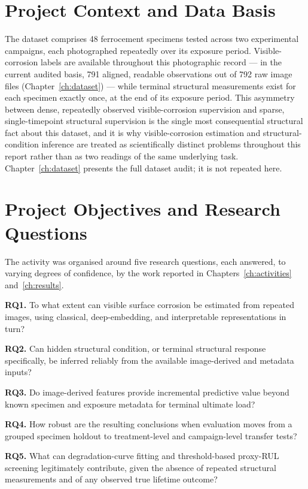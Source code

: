 \section{Project Context and Data Basis}
\label{sec:intro-context}

The dataset comprises 48 ferrocement specimens tested across two
experimental campaigns, each photographed repeatedly over its exposure
period. Visible-corrosion labels are available throughout this
photographic record — in the current audited basis, 791 aligned, readable
observations out of 792 raw image files (Chapter~\ref{ch:dataset}) — while
terminal structural measurements exist for each specimen exactly once, at
the end of its exposure period. This asymmetry between dense, repeatedly
observed visible-corrosion supervision and sparse, single-timepoint
structural supervision is the single most consequential structural fact
about this dataset, and it is why visible-corrosion estimation and
structural-condition inference are treated as scientifically distinct
problems throughout this report rather than as two readings of the same
underlying task. Chapter~\ref{ch:dataset} presents the full dataset audit;
it is not repeated here.

\section{Project Objectives and Research Questions}
\label{sec:intro-objectives}

The activity was organised around five research questions, each answered,
to varying degrees of confidence, by the work reported in
Chapters~\ref{ch:activities} and~\ref{ch:results}.

\textbf{RQ1.} To what extent can visible surface corrosion be estimated
from repeated images, using classical, deep-embedding, and interpretable
representations in turn?

\textbf{RQ2.} Can hidden structural condition, or terminal structural
response specifically, be inferred reliably from the available
image-derived and metadata inputs?

\textbf{RQ3.} Do image-derived features provide incremental predictive
value beyond known specimen and exposure metadata for terminal ultimate
load?

\textbf{RQ4.} How robust are the resulting conclusions when evaluation
moves from a grouped specimen holdout to treatment-level and campaign-level
transfer tests?

\textbf{RQ5.} What can degradation-curve fitting and threshold-based
proxy-RUL screening legitimately contribute, given the absence of repeated
structural measurements and of any observed true lifetime outcome?

